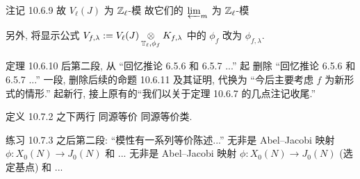 \documentclass{AJerrata}
\begin{document}
\begin{Errata}
		\item[注记 10.6.9]
		\Orig 故 $V_\ell(J)$ 为 $\mathbb{Z}_\ell$-模
		\Corr 故它们的 $\varprojlim_m$ 为 $\mathbb{Z}_\ell$-模
		
		另外, 将显示公式 $V_{f, \lambda} := V_\ell(J) \underset{\mathbb{T}_\ell, \phi_f}{\otimes} K_{f, \lambda}$ 中的 $\phi_f$ 改为 $\phi_{f, \lambda}$.
		
		\item[定理 10.6.10 后第二段, 从 ``回忆推论 6.5.6 和 6.5.7 ...'' 起]
		删除 ``回忆推论 6.5.6 和 6.5.7 ...'' 一段, 删除后续的命题 10.6.11 及其证明, 代换为 ``今后主要考虑 $f$ 为新形式的情形.'' 起新行, 接上原有的``我们以关于定理 10.6.7 的几点注记收尾.''
		
		\item[定义 10.7.2 之下两行]
		\Orig 同源等价
		\Corr 同源等价类.
		
		\item[练习 10.7.3 之后第二段: ``模性有一系列等价陈述...'']
		\Orig 无非是 Abel--Jacobi 映射 $\phi: X_0(N) \to J_0(N)$ 和 ...
		\Corr 无非是 Abel--Jacobi 映射 $\phi: X_0(N) \to J_0(N)$ (选定基点) 和 ...
	\end{Errata}
\end{document}
